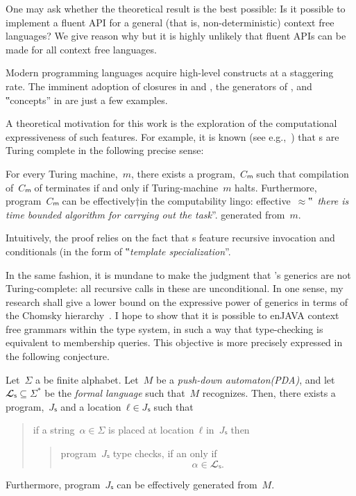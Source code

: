 One may ask whether the theoretical result is the
  best possible:
Is it possible to implement a fluent API for a general
  (that is, non-deterministic) context free languages?
We give reason why but it is highly unlikely that
  fluent APIs can be made for all context free languages.

Modern programming languages acquire high-level constructs
  at a staggering rate.
The imminent adoption of closures in \Java and \CC,
  the generators of \CSharp, and ‟concepts” in
  \CC are just a few examples.

A theoretical motivation for this work
  is the exploration of the computational
  expressiveness of such features.
For example, it is known (see e.g.,~\cite{Gutterman:2003}) that
  s are Turing complete in the following precise sense:

\begin{Theorem}
  \label{Theorem:Gutterman}
  For every Turing machine,~$m$, there exists a \CC program,~$Cₘ$ such that
    compilation of~$Cₘ$ of terminates if and only if
      Turing-machine~$m$ halts.
  Furthermore, program~$Cₘ$ can be effectively†{in the computability lingo:
    effective~$≈$‟~\emph{there is time
  bounded algorithm for carrying out the task}”.} generated from~$m$.
\end{Theorem}

Intuitively, the proof relies on the fact that s
  feature recursive invocation and conditionals (in the form of
  ‟\emph{template specialization}”.

In the same fashion, it is mundane to make the judgment that
  \Java's generics are not Turing-complete: all recursive calls
  in these are unconditional.
In one sense, my research shall give a lower bound on the
  expressive power of \Java generics in terms of the Chomsky hierarchy~\cite{Chomsky:1963}.
I hope to show that it is possible to enJAVA context free grammars within the \Java type system,
  in such a way that type-checking is equivalent to membership queries.
This objective is more precisely expressed in the following conjecture.

\begin{Theorem}
\label{Theorem:Gil-Levy}
Let~$Σ$ a be finite alphabet.
Let~$M$ be a \emph{push-down automaton(PDA)}, and let~$𝓛ₛ⊆Σ^*$ be
the \emph{formal language} such that~$M$ recognizes.
Then, there exists a \Java program,~$Jₛ$ and a location~$ℓ∈Jₛ$
such that
\begin{quote}
  if a string~$α∈Σ$ is
  placed at location~$ℓ$ in~$Jₛ$ then
  \begin{quote}
    program~$Jₛ$ type checks, if an only if
    \[
      α∈𝓛ₛ.
    \]
  \end{quote}
\end{quote}
Furthermore, program~$Jₛ$ can be effectively generated from~$M$.
\end{Theorem}

